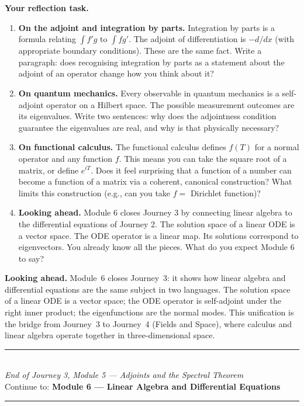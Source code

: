 \documentclass[12pt,a4paper]{article}
\begin{document}
\begin{reflectionbox}
\textbf{Your reflection task.}

\begin{enumerate}
  \item \textbf{On the adjoint and integration by parts.} Integration by parts is a formula relating $\int f'g$ to $\int fg'$. The adjoint of differentiation is $-d/dx$ (with appropriate boundary conditions). These are the same fact. Write a paragraph: does recognising integration by parts as a statement about the adjoint of an operator change how you think about it?

  \item \textbf{On quantum mechanics.} Every observable in quantum mechanics is a self-adjoint operator on a Hilbert space. The possible measurement outcomes are its eigenvalues. Write two sentences: why does the adjointness condition guarantee the eigenvalues are real, and why is that physically necessary?

  \item \textbf{On functional calculus.} The functional calculus defines $f(T)$ for a normal operator and any function $f$. This means you can take the square root of a matrix, or define $e^{iT}$. Does it feel surprising that a function of a number can become a function of a matrix via a coherent, canonical construction? What limits this construction (e.g., can you take $f = $ Dirichlet function)?

  \item \textbf{Looking ahead.} Module 6 closes Journey 3 by connecting linear algebra to the differential equations of Journey 2. The solution space of a linear ODE is a vector space. The ODE operator is a linear map. Its solutions correspond to eigenvectors. You already know all the pieces. What do you expect Module 6 to say?
\end{enumerate}
\end{reflectionbox}

\medskip
\noindent\textbf{Looking ahead.}
Module~6 closes Journey~3: it shows how linear algebra and differential equations are the same subject in two languages. The solution space of a linear ODE is a vector space; the ODE operator is self-adjoint under the right inner product; the eigenfunctions are the normal modes. This unification is the bridge from Journey~3 to Journey~4 (Fields and Space), where calculus and linear algebra operate together in three-dimensional space.

\vspace{1.4cm}
\begin{center}
{\color{MidBlue}\rule{0.5\linewidth}{0.8pt}}\\[6pt]
{\small\color{DarkGrey}\textit{End of Journey 3, Module 5 --- Adjoints and the Spectral Theorem}}\\[4pt]
{\small\color{DarkGrey}Continue to: \textbf{Module 6 --- Linear Algebra and Differential Equations}}\\[6pt]
{\color{MidBlue}\rule{0.5\linewidth}{0.8pt}}
\end{center}
\end{document}
